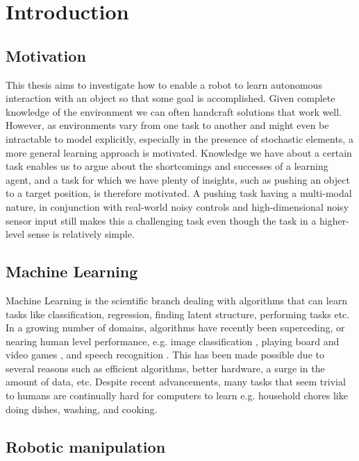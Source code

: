 \chapter{Introduction}

\section{Motivation}

This thesis aims to investigate how to enable a robot to learn autonomous
interaction with an object so that some goal is accomplished. Given complete
knowledge of the environment we can often handcraft solutions that work well.
However, as environments vary from one task to another and might even be
intractable to model explicitly, especially in the presence of stochastic
elements, a more general learning approach is motivated. Knowledge we have
about a certain task enables us to argue about the shortcomings and successes
of a learning agent, and a task for which we have plenty of insights, such as
pushing an object to a target position, is therefore motivated. A pushing task
having a multi-modal nature, in conjunction with real-world noisy controls and
high-dimensional noisy sensor input still makes this a challenging task even
though the task in a higher-level sense is relatively simple.

\section{Machine Learning}

Machine Learning is the scientific branch dealing with algorithms that can
learn tasks like classification, regression, finding latent structure,
performing tasks etc. In a growing number of domains, algorithms have recently
been superceding, or nearing human level performance, e.g. image classification
\cite{krizhevsky2012imagenet,he2016deep}, playing board
\cite{silver2016mastering} and video games \cite{mnih2013playing}, and speech
recognition \cite{hinton2012deep,dahl2012context}. This has been made possible
due to several reasons such as efficient algorithms, better hardware, a surge
in the amount of data, etc. Despite recent advancements, many tasks that seem
trivial to humans are continually hard for computers to learn e.g. household
chores like doing dishes, washing, and cooking.

\section{Robotic manipulation}

